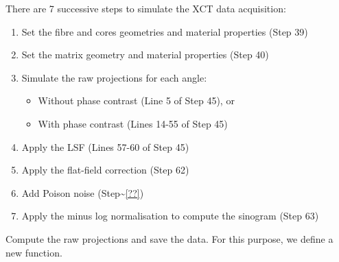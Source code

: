 \documentclass[11pt]{article}
\providecommand{\tightlist}{%
      \setlength{\itemsep}{0pt}\setlength{\parskip}{0pt}}
\begin{document}
There are 7 successive steps to simulate the XCT data acquisition:

\begin{enumerate}
\def\labelenumi{\arabic{enumi}.}
\tightlist
\item
  Set the fibre and cores geometries and material properties (Step 39)
\item
  Set the matrix geometry and material properties (Step 40)
\item
  Simulate the raw projections for each angle:

  \begin{itemize}
  \tightlist
  \item
    Without phase contrast (Line 5 of Step 45), or
  \item
    With phase contrast (Lines 14-55 of Step 45)
  \end{itemize}
\item
  Apply the LSF (Lines 57-60 of Step 45)
\item
  Apply the flat-field correction (Step 62)
\item
  Add Poison noise (Step\textasciitilde{}\ref{??})
\item
  Apply the minus log normalisation to compute the sinogram (Step 63)
\end{enumerate}

Compute the raw projections and save the data. For this purpose, we
define a new function.
\end{document}
